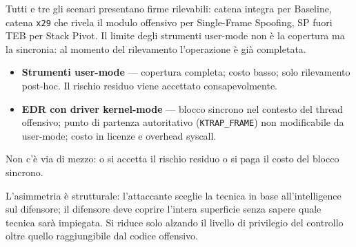 Tutti e tre gli scenari presentano firme rilevabili: catena integra per
Baseline, catena \texttt{x29} che rivela il modulo offensivo per Single-Frame Spoofing,
SP fuori TEB per Stack Pivot. Il limite degli strumenti user-mode non è la
copertura ma la sincronia: al momento del rilevamento l'operazione è già
completata.

\begin{itemize}
  \item \textbf{Strumenti user-mode} — copertura completa; costo basso;
        solo rilevamento post-hoc. Il rischio residuo viene accettato
        consapevolmente.
  \item \textbf{EDR con driver kernel-mode} — blocco sincrono nel contesto
        del thread offensivo; punto di partenza autoritativo
        (\texttt{KTRAP\_FRAME}) non modificabile da user-mode; costo in
        licenze e overhead syscall.
\end{itemize}

Non c'è via di mezzo: o si accetta il rischio residuo o si paga il costo
del blocco sincrono.

\bigskip
\noindent
L'asimmetria è strutturale: l'attaccante sceglie la tecnica in base
all'intelligence sul difensore; il difensore deve coprire l'intera superficie
senza sapere quale tecnica sarà impiegata. Si riduce solo alzando il livello
di privilegio del controllo oltre quello raggiungibile dal codice offensivo.
